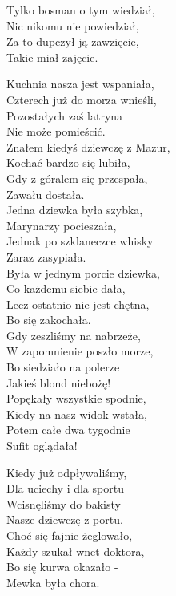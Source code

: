 \begin{multicols}{2}
Tylko bosman o tym wiedział, \\
Nic nikomu nie powiedział, \\
Za to dupczył ją zawzięcie, \\
Takie miał zajęcie.\\
\newcolumn

Kuchnia nasza jest wspaniała, \\
Czterech już do morza wnieśli, \\
Pozostałych zaś latryna\\
Nie może pomieścić.\\

Znałem kiedyś dziewczę z Mazur, \\
Kochać bardzo się lubiła, \\
Gdy z góralem się przespała, \\
Zawału dostała.\\

Jedna dziewka była szybka, \\
Marynarzy pocieszała, \\
Jednak po szklaneczce whisky\\
Zaraz zasypiała.\\

Była w jednym porcie dziewka, \\
Co każdemu siebie dała, \\
Lecz ostatnio nie jest chętna, \\
Bo się zakochała.\\

Gdy zeszliśmy na nabrzeże, \\
W zapomnienie poszło morze, \\
Bo siedziało na polerze\\
Jakieś blond niebożę!\\

Popękały wszystkie spodnie, \\
Kiedy na nasz widok wstała, \\
Potem całe dwa tygodnie\\
Sufit oglądała!\\
\newcolumn

Kiedy już odpływaliśmy, \\
Dla uciechy i dla sportu\\
Wcisnęliśmy do bakisty\\
Nasze dziewczę z portu.\\

Choć się fajnie żeglowało, \\
Każdy szukał wnet doktora, \\
Bo się kurwa okazało -\\
Mewka była chora.\\


\end{multicols}
